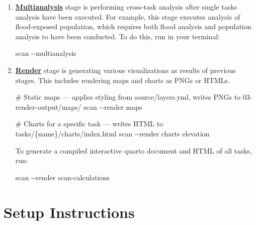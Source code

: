 \documentclass[
  letterpaper,
  DIV=11,
  numbers=noendperiod]{scrreprt}
\newenvironment{Shaded}{\begin{snugshade}}{\end{snugshade}}
\newcommand{\AttributeTok}[1]{\textcolor[rgb]{0.40,0.45,0.13}{#1}}
\newcommand{\CommentTok}[1]{\textcolor[rgb]{0.37,0.37,0.37}{#1}}
\newcommand{\ExtensionTok}[1]{\textcolor[rgb]{0.00,0.23,0.31}{#1}}
\newcommand{\NormalTok}[1]{\textcolor[rgb]{0.00,0.23,0.31}{#1}}
\begin{document}
\begin{enumerate}
\def\labelenumi{\arabic{enumi}.}
\setcounter{enumi}{3}
\item
  \href{running-first-cityscan.qmd}{\textbf{Multianalysis}} stage is
  performing cross-task analysis after single tasks analysis have been
  executed. For example, this stage executes analysis of flood-exposed
  population, which requires both flood analysis and population analysis
  to have been conducted. To do this, run in your terminal:

\begin{Shaded}
\begin{Highlighting}[]
\ExtensionTok{scan} \AttributeTok{{-}{-}multianalysis}
\end{Highlighting}
\end{Shaded}
\item
  \href{running-first-cityscan.qmd}{\textbf{Render}} stage is generating
  various visualizations as results of previous stages. This includes
  rendering maps and charts as PNGs or HTMLs.

\begin{Shaded}
\begin{Highlighting}[]
\CommentTok{\# Static maps — applies styling from source/layers.yml, writes PNGs to 03{-}render{-}output/maps/}
\ExtensionTok{scan} \AttributeTok{{-}{-}render}\NormalTok{ maps}
\end{Highlighting}
\end{Shaded}

\begin{Shaded}
\begin{Highlighting}[]
\CommentTok{\# Charts for a specific task — writes HTML to tasks/\{name\}/charts/index.html}
\ExtensionTok{scan} \AttributeTok{{-}{-}render}\NormalTok{ charts elevation}
\end{Highlighting}
\end{Shaded}

  To generate a compiled interactive quarto document and HTML of all
  tasks, run:

\begin{Shaded}
\begin{Highlighting}[]
\ExtensionTok{scan} \AttributeTok{{-}{-}render}\NormalTok{ scan{-}calculations}
\end{Highlighting}
\end{Shaded}
\end{enumerate}

\chapter{Setup Instructions}\label{setup-instructions}
\end{document}
